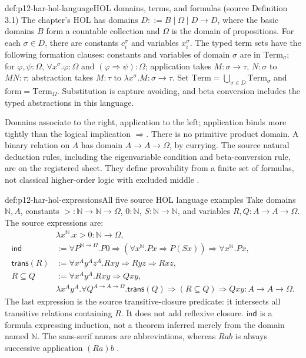 \begin{hbdefinition}{def:p12-har-hol-language}{HOL domains, terms, and formulas (source Definition 3.1)}
The chapter's \(\mathrm{HOL}\) has domains
\(D::=B\mid\Omega\mid D\to D\), where the basic domains \(B\)
form a countable collection and \(\Omega\) is the domain of propositions.
For each \(\sigma\in D\), there are constants \(c_i^\sigma\)
and variables \(x_i^\sigma\). The typed term sets have the following
formation clauses: constants and variables of domain \(\sigma\) are
in \(\mathrm{Term}_\sigma\); for \(\varphi,\psi:\Omega\),
\(\forall x^\sigma.\varphi:\Omega\) and
\((\varphi\Rightarrow\psi):\Omega\); application takes
\(M:\sigma\to\tau\), \(N:\sigma\) to \(MN:\tau\);
abstraction takes \(M:\tau\) to
\(\lambda x^\sigma.M:\sigma\to\tau\).
Set \(\mathrm{Term}=\bigcup_{\sigma\in D}\mathrm{Term}_\sigma\)
and \(\mathrm{form}=\mathrm{Term}_\Omega\).
Substitution is capture avoiding, and beta conversion includes the
typed abstractions in this language.

Domains associate to the right, application to the left; application binds
more tightly than the logical implication \(\Rightarrow\).
There is no primitive product domain. A binary relation on \(A\) has
domain \(A\to A\to\Omega\), by currying. The source natural
deduction rules, including the eigenvariable condition and beta-conversion
rule, are on the registered sheet. They define provability from a finite
set of formulas, not classical higher-order logic with excluded middle
\cite[pp.~1181--1183, Fig.~1]{BarendregtGeuvers2001}.
\end{hbdefinition}

\begin{hbexample}{def:p12-har-hol-expressions}{All five source HOL language examples}
Take domains \(\mathbb N,A\), constants
\(>:\mathbb N\to\mathbb N\to\Omega\),
\(0:\mathbb N\), \(S:\mathbb N\to\mathbb N\), and
variables \(R,Q:A\to A\to\Omega\). The source expressions are:
\[
\begin{aligned}
 &\lambda x^{\mathbb N}.x>0:\mathbb N\to\Omega,\\
 \mathsf{ind}&:=\forall P^{\mathbb N\to\Omega}.
   P0\Rightarrow(\forall x^{\mathbb N}.Px\Rightarrow P(Sx))
       \Rightarrow\forall x^{\mathbb N}.Px,\\
 \mathsf{trans}(R)&:=\forall x^Ay^Az^A.
       Rxy\Rightarrow Ryz\Rightarrow Rxz,\\
 R\subseteq Q&:=\forall x^Ay^A.Rxy\Rightarrow Qxy,\\
 &\lambda x^Ay^A.\forall Q^{A\to A\to\Omega}.
      \mathsf{trans}(Q)\Rightarrow(R\subseteq Q)\Rightarrow Qxy
       :A\to A\to\Omega.
\end{aligned}
\]
The last expression is the source transitive-closure predicate: it
intersects all transitive relations containing \(R\). It does not add
reflexive closure. \(\mathsf{ind}\) is a formula expressing induction,
not a theorem inferred merely from the domain named \(\mathbb N\).
The sans-serif names are abbreviations, whereas \(Rab\) is always
successive application \((Ra)b\)
\cite[p.~1182, Example~3.3]{BarendregtGeuvers2001}.
\end{hbexample}

